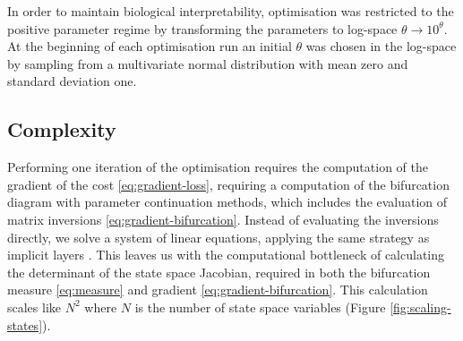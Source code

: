 \documentclass{article}
\begin{document}
In order to maintain biological interpretability, optimisation was restricted to the positive parameter regime by transforming the parameters to log-space $\theta\rightarrow10^\theta$. At the beginning of each optimisation run an initial $\theta$ was chosen in the log-space by sampling from a multivariate normal distribution with mean zero and standard deviation one.


\subsection{Complexity}

Performing one iteration of the optimisation requires the computation of the gradient of the cost \eqref{eq:gradient-loss}, requiring a computation of the bifurcation diagram with parameter continuation methods, which includes the evaluation of matrix inversions \eqref{eq:gradient-bifurcation}. Instead of evaluating the inversions directly, we solve a system of linear equations, applying the same strategy as implicit layers \cite{Look2020DifferentiableLayers,Bai2019DeepModels}. This leaves us with the computational bottleneck of calculating the determinant of the state space Jacobian, required in both the bifurcation measure \eqref{eq:measure} and gradient \eqref{eq:gradient-bifurcation}. This calculation scales like $N^2$ where $N$ is the number of state space variables (Figure \ref{fig:scaling-states}).
\end{document}
